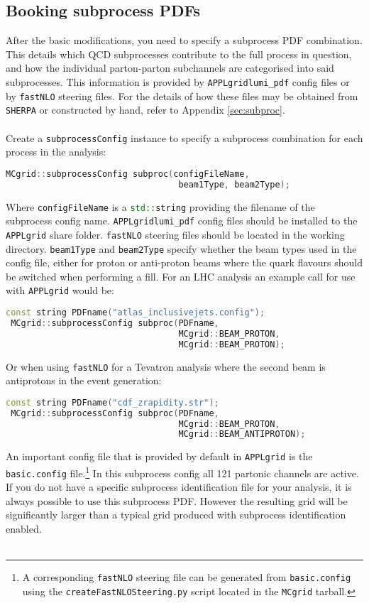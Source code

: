 \documentclass[11pt]{article}
\newcommand{\mcgrid} {{\tt MCgrid}\xspace}
\newcommand{\appl} {{\tt APPLgrid}\xspace}
\newcommand{\fnlo} {{\tt fastNLO}\xspace}
\newcommand{\sherpa} {{\tt SHERPA}\xspace}
\begin{document}
\subsection{Booking subprocess PDFs}
\label{sec:book_subproc}
After the basic modifications, you need to specify a subprocess PDF combination. This details which QCD subprocesses contribute to the full process in question, and how the individual parton-parton subchannels are categorised into said subprocesses. This information is provided by \appl \lstinline[language=c++]{lumi_pdf} config files or by \fnlo steering files. For the details of how these files may be obtained from \sherpa or constructed by hand, refer to Appendix \ref{sec:subproc}.\\\\
Create a \lstinline[language=c++]{subprocessConfig} instance to specify a subprocess combination for each process in the analysis:
\begin{lstlisting}[language=c++]
 MCgrid::subprocessConfig subproc(configFileName,
                                  beam1Type, beam2Type);
\end{lstlisting}
Where \lstinline[language=c++]{configFileName} is a \lstinline[language=c++]{std::string} providing the filename of the subprocess config name. \appl \lstinline[language=c++]{lumi_pdf} config files should be installed to the \appl share folder. \fnlo steering files should be located in the working directory. \lstinline[language=c++]{beam1Type} and \lstinline[language=c++]{beam2Type} specify whether the beam types used in the config file, either for proton or anti-proton beams where the quark flavours should be switched when performing a fill. For an LHC analysis an example call for use with \appl would be:
\begin{lstlisting}[language=c++]
 const string PDFname("atlas_inclusivejets.config");
 MCgrid::subprocessConfig subproc(PDFname,
                                  MCgrid::BEAM_PROTON,
                                  MCgrid::BEAM_PROTON);
\end{lstlisting}
Or when using \fnlo for a Tevatron analysis where the second beam is antiprotons in the event generation:
\begin{lstlisting}[language=c++]
 const string PDFname("cdf_zrapidity.str");
 MCgrid::subprocessConfig subproc(PDFname,
                                  MCgrid::BEAM_PROTON,
                                  MCgrid::BEAM_ANTIPROTON);
\end{lstlisting}
An important config file that is provided by default in \appl is the \lstinline[language=bash]{basic.config} file.\footnote{A corresponding \fnlo steering file can be generated from \lstinline[language=bash]{basic.config} using the \lstinline[language=bash]{createFastNLOSteering.py} script located in the \mcgrid tarball.} In this subprocess config all 121 partonic channels are active. If you do not have a specific subprocess identification file for your analysis, it is always possible to use this subprocess PDF. However the resulting grid will be significantly larger than a typical grid produced with subprocess identification enabled. \\\\
\end{document}
